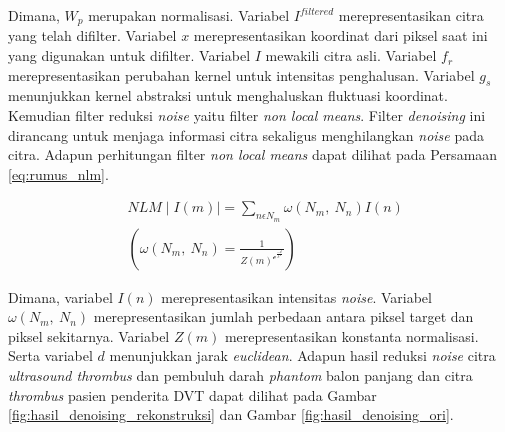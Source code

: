 {Dimana, $W_p$ merupakan normalisasi. Variabel $I^{filtered}$ merepresentasikan citra yang telah difilter. Variabel $x$ merepresentasikan koordinat dari piksel saat ini yang digunakan untuk difilter. Variabel $I$ mewakili citra asli. Variabel $f_r$ merepresentasikan perubahan kernel untuk intensitas penghalusan. Variabel $g_s$ menunjukkan kernel abstraksi untuk menghaluskan fluktuasi koordinat. Kemudian filter reduksi \textit{noise} yaitu filter \textit{non local means}. Filter \textit{denoising} ini dirancang untuk menjaga informasi citra sekaligus menghilangkan \textit{noise} pada citra. Adapun perhitungan filter \textit{non local means} dapat dilihat pada Persamaan \ref{eq:rumus_nlm}.

\begin{equation} \label{eq:rumus_nlm}
	\begin{split}
		&NLM\mid I(m)\mid =\sum_{n\epsilon N_m}\omega(N_m,\ N_n)I(n)\\ &\left(\omega(N_m,\ N_n) = \frac{1}{Z\left(m\right)^{\mathcal{e}^\frac{-d}{h^2}}}\right)
	\end{split}    
\end{equation}

Dimana, variabel $I(n)$ merepresentasikan intensitas \textit{noise}. Variabel $\omega(N_m,\ N_n)$ merepresentasikan jumlah perbedaan antara piksel target dan piksel sekitarnya. Variabel $Z(m)$ merepresentasikan konstanta  normalisasi. Serta variabel $d$ menunjukkan jarak \textit{euclidean}. Adapun hasil reduksi \textit{noise} citra \textit{ultrasound thrombus} dan pembuluh darah \textit{phantom} balon panjang dan citra \textit{thrombus} pasien penderita DVT dapat dilihat pada Gambar \ref{fig:hasil_denoising_rekonstruksi} dan Gambar \ref{fig:hasil_denoising_ori}.

}
